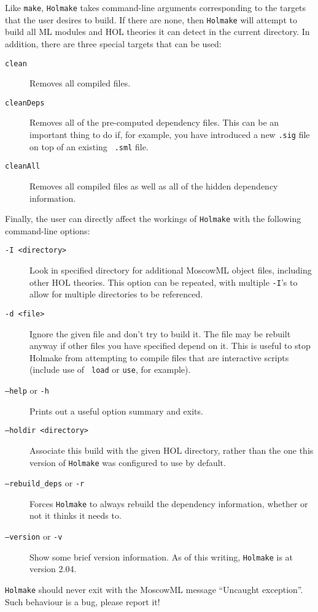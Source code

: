 Like {\tt make}, {\tt Holmake} takes command-line arguments
corresponding to the targets that the user desires to build.  If there
are none, then {\tt Holmake} will attempt to build all ML modules and
HOL theories it can detect in the current directory.  In addition,
there are three special targets that can be used:
\begin{description}
\item[{\tt clean}] Removes all compiled files.
\item [{\tt cleanDeps}] Removes all of the pre-computed dependency
  files.  This can be an important thing to do if, for example, you
  have introduced a new {\tt .sig} file on top of an existing {\tt
  .sml} file.
\item [{\tt cleanAll}] Removes all compiled files as well as all of
  the hidden dependency information.
\end{description}

Finally, the user can directly affect the workings of \verb+Holmake+
with the following command-line options:
\begin{description}
\item[\tt -I <directory>] Look in specified directory for additional
  MoscowML object files, including other HOL theories.  This option
  can be repeated, with multiple {\tt -I}'s to allow for multiple
  directories to be referenced.
\item[\tt -d <file>] Ignore the given file and don't try to build it.
  The file may be rebuilt anyway if other files you have specified
  depend on it.  This is useful to stop Holmake from attempting to
  compile files that are interactive scripts (include use of {\tt
  load} or {\tt use}, for example).
\item[{\tt --help} or {\tt -h}] Prints out a useful option summary and
  exits.
\item[\tt --holdir <directory>] Associate this build with the given
  HOL directory, rather than the one this version of {\tt Holmake} was
  configured to use by default.
\item[{\tt --rebuild\_deps} or {\tt -r}] Forces {\tt Holmake} to
  always rebuild the dependency information, whether or not it thinks
  it needs to.
\item[{\tt --version} or {\tt -v}] Show some brief version
  information.  As of this writing, {\tt Holmake} is at version 2.04.
\end{description}

{\tt Holmake} should never exit with the MoscowML message ``Uncaught
exception''.  Such behaviour is a bug, please report it!



